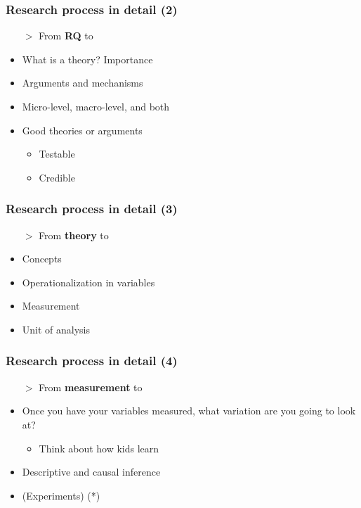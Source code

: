 \documentclass[aspectratio=43]{beamer}
\begin{document}
\begin{frame}
\frametitle{Research process in detail (2)}
\centering

\begin{itemize}
  \item[$>$] From \textbf{RQ} to 
  \item[]
  \item<2-> What is a theory? Importance
  \item<3-> Arguments and mechanisms
  \item<3-> Micro-level, macro-level, and both
  \item<4-> Good theories or arguments
  \begin{itemize}
    \item Testable
    \item Credible
  \end{itemize}
\end{itemize}

\end{frame}

\begin{frame}
\frametitle{Research process in detail (3)}
\centering

\begin{itemize}
  \item[$>$] From \textbf{theory} to 
  \item[]
  \item Concepts
  \item Operationalization in variables
  \item Measurement
  \item Unit of analysis
\end{itemize}

\end{frame}

\begin{frame}
\frametitle{Research process in detail (4)}
\centering

\begin{itemize}
  \item[$>$] From \textbf{measurement} to 
  \item[]
  \item Once you have your variables measured, what variation are you going to look at?
  \begin{itemize}
    \item Think about how kids learn
  \end{itemize}
  \item Descriptive and causal inference
  \item (Experiments) (*)
\end{itemize}

\end{frame}
\end{document}
